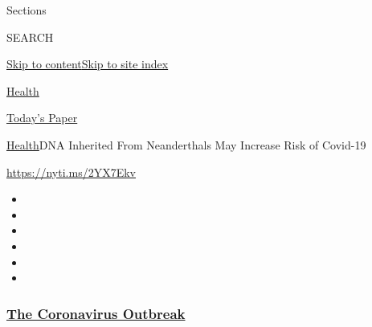 Sections

SEARCH

\protect\hyperlink{site-content}{Skip to
content}\protect\hyperlink{site-index}{Skip to site index}

\href{https://www.nytimes3xbfgragh.onion/section/health}{Health}

\href{https://myaccount.nytimes3xbfgragh.onion/auth/login?response_type=cookie\&client_id=vi}{}

\href{https://www.nytimes3xbfgragh.onion/section/todayspaper}{Today's
Paper}

\href{/section/health}{Health}\textbar{}DNA Inherited From Neanderthals
May Increase Risk of Covid-19

\url{https://nyti.ms/2YX7Ekv}

\begin{itemize}
\item
\item
\item
\item
\item
\item
\end{itemize}

\hypertarget{the-coronavirus-outbreak}{%
\subsubsection{\texorpdfstring{\href{https://www.nytimes3xbfgragh.onion/news-event/coronavirus?name=styln-coronavirus-national\&region=TOP_BANNER\&block=storyline_menu_recirc\&action=click\&pgtype=Article\&impression_id=4e7d9530-efba-11ea-bf6c-d9d97a131239\&variant=undefined}{The
Coronavirus
Outbreak}}{The Coronavirus Outbreak}}\label{the-coronavirus-outbreak}}

